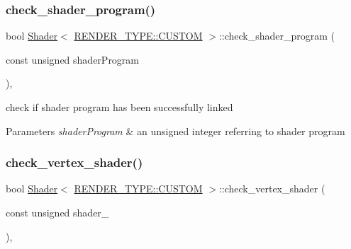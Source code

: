 \subsubsection{\texorpdfstring{check\+\_\+shader\+\_\+program()}{check\_shader\_program()}}
{\footnotesize\ttfamily bool \mbox{\hyperlink{classShader}{Shader}}$<$ \mbox{\hyperlink{shader__class_8hpp_a24e288e18eb7b6e01de7565001fedb60a72baef04098f035e8a320b03ad197818}{R\+E\+N\+D\+E\+R\+\_\+\+T\+Y\+P\+E\+::\+C\+U\+S\+T\+OM}} $>$\+::check\+\_\+shader\+\_\+program (\begin{DoxyParamCaption}\item[{const unsigned}]{shader\+Program }\end{DoxyParamCaption})\hspace{0.3cm}{\ttfamily [inline]}, {\ttfamily [protected]}}



check if shader program has been successfully linked 


\begin{DoxyParams}{Parameters}
{\em shader\+Program} & an unsigned integer referring to shader program \\
\hline
\end{DoxyParams}
\mbox{\label{classShader_3_01RENDER__TYPE_1_1CUSTOM_01_4_afca4ecec5bed3cf6a9f219ce52e5343e}} 
\subsubsection{\texorpdfstring{check\+\_\+vertex\+\_\+shader()}{check\_vertex\_shader()}}
{\footnotesize\ttfamily bool \mbox{\hyperlink{classShader}{Shader}}$<$ \mbox{\hyperlink{shader__class_8hpp_a24e288e18eb7b6e01de7565001fedb60a72baef04098f035e8a320b03ad197818}{R\+E\+N\+D\+E\+R\+\_\+\+T\+Y\+P\+E\+::\+C\+U\+S\+T\+OM}} $>$\+::check\+\_\+vertex\+\_\+shader (\begin{DoxyParamCaption}\item[{const unsigned}]{shader\+\_\+ }\end{DoxyParamCaption})\hspace{0.3cm}{\ttfamily [inline]}, {\ttfamily [protected]}}



